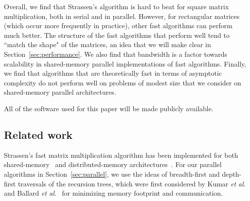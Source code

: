 \documentclass[preprint]{sigplanconf}
\begin{document}
Overall, we find that Strassen's algorithm is hard to beat for square matrix multiplication, both in serial and in parallel.
However, for rectangular matrices (which occur more frequently in practice), other fast algorithms can perform much better.
The structure of the fast algorithms that perform well tend to ``match the shape" of the matrices, an idea that we will make clear in Section~\ref{sec:performance}.
We also find that bandwidth is a factor towards scalability in shared-memory parallel implementations of fast algorithms.
Finally, we find that algorithms that are theoretically fast in terms of asymptotic complexity do not perform well on problems of modest size that we consider on shared-memory parallel architectures.

All of the software used for this paper will be made publicly available.

\subsection{Related work}
\label{sec:related}

Strassen's fast matrix multiplication algorithm has been implemented for both shared-memory~\cite{kumar1995tensor, d2011exploiting} and distributed-memory architectures~\cite{grayson1996high, luo1995scalable, ballard2012communication}.
For our parallel algorithms in Section~\ref{sec:parallel}, we use the ideas of breadth-first and depth-first traversals of the recursion trees, which were first considered by Kumar \emph{et al}.~\cite{kumar1995tensor} and Ballard \emph{et al}.~\cite{ballard2012communication} for minimizing memory footprint and communication.
\end{document}
